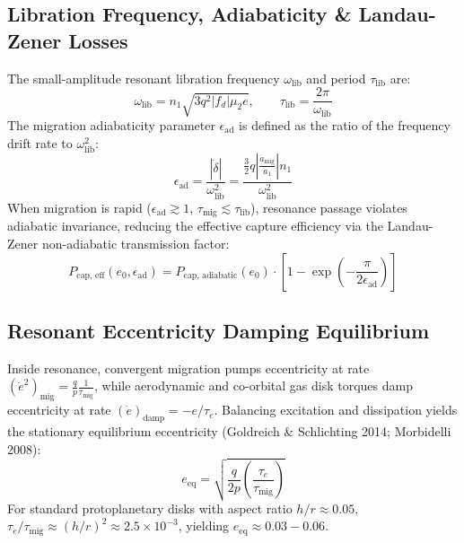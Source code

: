 \documentclass[11pt,a4paper]{article}
\begin{document}
\subsection{Libration Frequency, Adiabaticity \& Landau-Zener Losses}
The small-amplitude resonant libration frequency $\omega_{\text{lib}}$ and period $\tau_{\text{lib}}$ are:
\begin{equation}
\omega_{\text{lib}} = n_1 \sqrt{3 q^2 |f_d| \mu_2 e}, \qquad \tau_{\text{lib}} = \frac{2\pi}{\omega_{\text{lib}}}
\label{eq:omega_lib}
\end{equation}
The migration adiabaticity parameter $\epsilon_{\text{ad}}$ is defined as the ratio of the frequency drift rate to $\omega_{\text{lib}}^2$:
\begin{equation}
\epsilon_{\text{ad}} = \frac{|\dot{\delta}|}{\omega_{\text{lib}}^2} = \frac{\frac{3}{2} q \left|\frac{\dot{a}_{\text{mig}}}{a_1}\right| n_1}{\omega_{\text{lib}}^2}
\label{eq:eps_ad}
\end{equation}
When migration is rapid ($\epsilon_{\text{ad}} \gtrsim 1$, $\tau_{\text{mig}} \lesssim \tau_{\text{lib}}$), resonance passage violates adiabatic invariance, reducing the effective capture efficiency via the Landau-Zener non-adiabatic transmission factor:
\begin{equation}
P_{\text{cap, eff}}(e_0, \epsilon_{\text{ad}}) = P_{\text{cap, adiabatic}}(e_0) \cdot \left[ 1 - \exp\left( -\frac{\pi}{2 \epsilon_{\text{ad}}} \right) \right]
\label{eq:lz_factor}
\end{equation}

\subsection{Resonant Eccentricity Damping Equilibrium}
Inside resonance, convergent migration pumps eccentricity at rate $(\dot{e}^2)_{\text{mig}} = \frac{q}{p} \frac{1}{\tau_{\text{mig}}}$, while aerodynamic and co-orbital gas disk torques damp eccentricity at rate $(\dot{e})_{\text{damp}} = -e/\tau_e$. Balancing excitation and dissipation yields the stationary equilibrium eccentricity (Goldreich \& Schlichting 2014; Morbidelli 2008):
\begin{equation}
e_{\text{eq}} = \sqrt{ \frac{q}{2p} \left(\frac{\tau_e}{\tau_{\text{mig}}}\right) }
\label{eq:e_eq}
\end{equation}
For standard protoplanetary disks with aspect ratio $h/r \approx 0.05$, $\tau_e / \tau_{\text{mig}} \approx (h/r)^2 \approx 2.5\times 10^{-3}$, yielding $e_{\text{eq}} \approx 0.03 - 0.06$.
\end{document}
